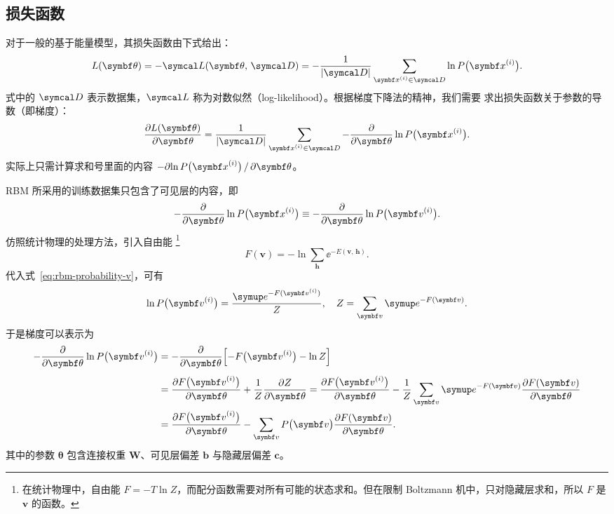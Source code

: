 \subsection{损失函数}

对于一般的基于能量模型，其损失函数由下式给出：
\begin{equation}
  \label{eq:ebm-loss-function}
  L(\bm{\theta})
  = - \likeL(\bm{\theta},\,\domD)
  = - \frac{1}{\abs{\domD}} \sum_{\bm{x}^{(i)}\in\domD} \ln P\qty\big(\bm{x}^{(i)}).
\end{equation}
式中的 $\domD$ 表示数据集，$\likeL$ 称为对数似然（log-likelihood）。根据梯度下降法的精神，我们需要
求出损失函数关于参数的导数（即梯度）：
\begin{equation}
  \pdv{L(\bm{\theta})}{\bm{\theta}}
  = \frac{1}{\abs{\domD}} \sum_{\bm{x}^{(i)}\in\domD}
    - \pdv{\bm{\theta}} \ln P\qty\big(\bm{x}^{(i)}).
\end{equation}
实际上只需计算求和号里面的内容 $-\partial{\ln P\qty\big(\bm{x}^{(i)})}\,/\,\partial{\bm{\theta}}$。

RBM 所采用的训练数据集只包含了可见层的内容，即
\begin{equation}
  - \pdv{\bm{\theta}} \ln P\qty\big(\bm{x}^{(i)}) \equiv
  - \pdv{\bm{\theta}} \ln P\qty\big(\bm{v}^{(i)}).
\end{equation}
仿照统计物理的处理方法，引入自由能
\footnote{在统计物理中，自由能 $F=-T\ln Z$，而配分函数需要对所有可能的状态求和。但在限制
  Boltzmann 机中，只对隐藏层求和，所以 $F$ 是 $\bm{v}$ 的函数。}
\begin{equation}
  F(\bm{v}) = - \ln \sum_{\bm{h}} \ee^{-E(\bm{v},\,\bm{h})}.
\end{equation}
代入式~\eqref{eq:rbm-probability-v}，可有
\begin{equation}
  \ln P\qty\big(\bm{v}^{(i)}) = \frac{\ee^{-F(\bm{v}^{(i)})}}{Z} \qc
  Z = \sum_{\bm{v}} \ee^{-F(\bm{v})}.
\end{equation}
于是梯度可以表示为
\begin{align}
  \label{eq:rmb-gradient}
     - \pdv{\bm{\theta}} \ln P\qty\big(\bm{v}^{(i)})
  &= - \pdv{\bm{\theta}} \qty\Big[-F\qty\big(\bm{v}^{(i)}) - \ln Z]
     \vphantom{\sum_x} \notag \\
  &= \pdv{F\qty\big(\bm{v}^{(i)})}{\bm{\theta}} + \frac{1}{Z} \pdv{Z}{\bm{\theta}}
   = \pdv{F\qty\big(\bm{v}^{(i)})}{\bm{\theta}}
     - \frac{1}{Z} \sum_{\bm{v}} \ee^{-F(\bm{v})} \pdv{F(\bm{v})}{\bm{\theta}} \notag \\
  &= \pdv{F\qty\big(\bm{v}^{(i)})}{\bm{\theta}}
     - \sum_{\bm{v}} P\qty\big(\bm{v}) \pdv{F(\bm{v})}{\bm{\theta}}.
\end{align}
其中的参数 $\bm{\theta}$ 包含连接权重 $\bm{W}$、可见层偏差 $\bm{b}$ 与隐藏层偏差 $\bm{c}$。

